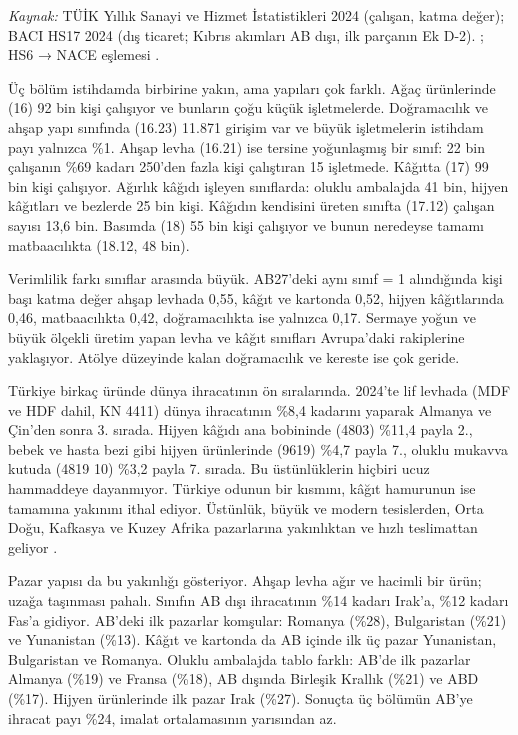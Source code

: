 \endgroup

\emph{Kaynak:} TÜİK Yıllık Sanayi ve Hizmet İstatistikleri 2024 (çalışan, katma değer); BACI HS17 2024 (dış ticaret; Kıbrıs akımları AB dışı, ilk parçanın Ek D-2). \etiketV{}; HS6 → NACE eşlemesi \etiketT{}.

Üç bölüm istihdamda birbirine yakın, ama yapıları çok farklı. Ağaç ürünlerinde (16) 92 bin kişi çalışıyor ve bunların çoğu küçük işletmelerde. Doğramacılık ve ahşap yapı sınıfında (16.23) 11.871 girişim var ve büyük işletmelerin istihdam payı yalnızca \%1. Ahşap levha (16.21) ise tersine yoğunlaşmış bir sınıf: 22 bin çalışanın \%69 kadarı 250'den fazla kişi çalıştıran 15 işletmede. Kâğıtta (17) 99 bin kişi çalışıyor. Ağırlık kâğıdı işleyen sınıflarda: oluklu ambalajda 41 bin, hijyen kâğıtları ve bezlerde 25 bin kişi. Kâğıdın kendisini üreten sınıfta (17.12) çalışan sayısı 13,6 bin. Basımda (18) 55 bin kişi çalışıyor ve bunun neredeyse tamamı matbaacılıkta (18.12, 48 bin).

Verimlilik farkı sınıflar arasında büyük. AB27'deki aynı sınıf = 1 alındığında kişi başı katma değer ahşap levhada 0,55, kâğıt ve kartonda 0,52, hijyen kâğıtlarında 0,46, matbaacılıkta 0,42, doğramacılıkta ise yalnızca 0,17. Sermaye yoğun ve büyük ölçekli üretim yapan levha ve kâğıt sınıfları Avrupa'daki rakiplerine yaklaşıyor. Atölye düzeyinde kalan doğramacılık ve kereste ise çok geride.

Türkiye birkaç üründe dünya ihracatının ön sıralarında. 2024'te lif levhada (MDF ve HDF dahil, KN 4411) dünya ihracatının \%8,4 kadarını yaparak Almanya ve Çin'den sonra 3. sırada. Hijyen kâğıdı ana bobininde (4803) \%11,4 payla 2., bebek ve hasta bezi gibi hijyen ürünlerinde (9619) \%4,7 payla 7., oluklu mukavva kutuda (4819 10) \%3,2 payla 7. sırada. Bu üstünlüklerin hiçbiri ucuz hammaddeye dayanmıyor. Türkiye odunun bir kısmını, kâğıt hamurunun ise tamamına yakınını ithal ediyor. Üstünlük, büyük ve modern tesislerden, Orta Doğu, Kafkasya ve Kuzey Afrika pazarlarına yakınlıktan ve hızlı teslimattan geliyor \etiketH{}.

Pazar yapısı da bu yakınlığı gösteriyor. Ahşap levha ağır ve hacimli bir ürün; uzağa taşınması pahalı. Sınıfın AB dışı ihracatının \%14 kadarı Irak'a, \%12 kadarı Fas'a gidiyor. AB'deki ilk pazarlar komşular: Romanya (\%28), Bulgaristan (\%21) ve Yunanistan (\%13). Kâğıt ve kartonda da AB içinde ilk üç pazar Yunanistan, Bulgaristan ve Romanya. Oluklu ambalajda tablo farklı: AB'de ilk pazarlar Almanya (\%19) ve Fransa (\%18), AB dışında Birleşik Krallık (\%21) ve ABD (\%17). Hijyen ürünlerinde ilk pazar Irak (\%27). Sonuçta üç bölümün AB'ye ihracat payı \%24, imalat ortalamasının yarısından az.

